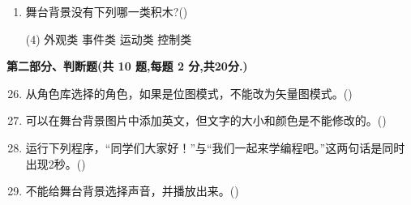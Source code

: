 \documentclass[10pt, a4paper]{article}
\begin{document}
\begin{enumerate}
        \item 舞台背景没有下列哪一类积木?(\qquad)
        \begin{tasks}(4)
            \task 外观类
            \task 事件类
            \task 运动类
            \task 控制类
        \end{tasks}
    \end{enumerate}

    \newpage
    {\noindent\textbf{第二部分、判断题(共 10 题,每题 2 分,共20分.)}}
    \begin{enumerate}
        \setcounter{enumi}{25}
        \item 从角色库选择的角色，如果是位图模式，不能改为矢量图模式。(\qquad)

        \item 可以在舞台背景图片中添加英文，但文字的大小和颜色是不能修改的。(\qquad)

        \item 运行下列程序，“同学们大家好！”与“我们一起来学编程吧。”这两句话是同时出现2秒。(\qquad)

        \item 不能给舞台背景选择声音，并播放出来。(\qquad)


\end{enumerate}
\end{document}
